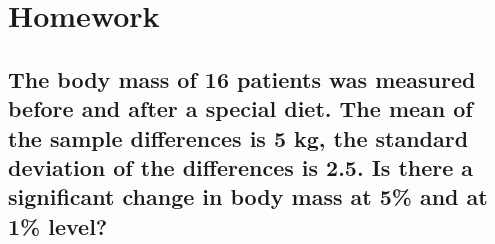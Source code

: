\section{Homework}
%	
%
%	
%
%
%
%
%		
%
%
%
%

\subsection{The body mass of 16 patients was measured before and after a special diet. The mean of the sample differences is 5 kg, the standard deviation of the differences is 2.5. Is there a significant change in body mass at 5\% and at 1\% level?}
	
